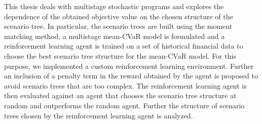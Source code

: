 \documentclass[12pt]{report}
\begin{document}

This thesis deals with multistage stochastic programs and explores the dependence of the obtained objective value on the chosen structure of the scenario tree. In particular, the scenario trees are built using the moment matching method, a multistage mean-CVaR model is formulated and a reinforcement learning agent is trained on a set of historical financial data to choose the best scenario tree structure for the mean-CVaR model. For this purpose, we implemented a custom reinforcement learning environment. Further an inclusion of a penalty term in the reward obtained by the agent is proposed to avoid scenario trees that are too complex. The reinforcement learning agent is then evaluated against an agent that chooses the scenario tree structure at random and outperforms the random agent. Further the structure of scenario trees chosen by the reinforcement learning agent is analyzed.
\end{document}
